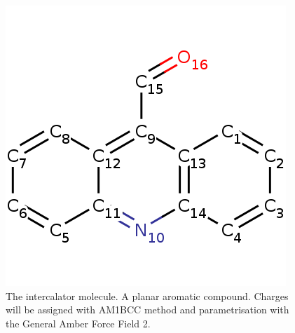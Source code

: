 \documentclass{article}
\begin{document}
\begin{figure}
  \includegraphics[width=\textwidth]{9AC-large.png}
  \caption{The intercalator molecule. A planar aromatic compound. Charges will be assigned with AM1BCC method and parametrisation with the General Amber Force Field 2.}
  \label{fig:pdb-3}
\end{figure}
\end{document}
